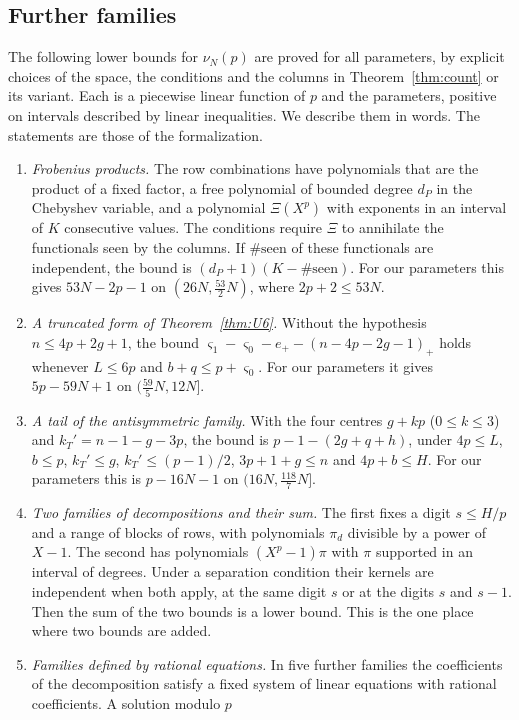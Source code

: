 \subsection{Further families}\label{ssec:families}
The following lower bounds for $\nu_N(p)$ are proved for all parameters, by explicit choices of the space,
the conditions and the columns in Theorem~\ref{thm:count} or its variant. Each is a piecewise linear function
of $p$ and the parameters, positive on intervals described by linear inequalities. We describe them in
words. The statements are those of the formalization.
\begin{enumerate}[label=(F\arabic*),wide]
\item \emph{Frobenius products.} The row combinations have polynomials that are the product of a fixed
factor, a free polynomial of bounded degree $d_P$ in the Chebyshev variable, and a polynomial $\Xi(X^p)$ with
exponents in an interval of $K$ consecutive values. The conditions require $\Xi$ to annihilate the
functionals seen by the columns. If $\#\text{seen}$ of these functionals are independent, the bound is
$(d_P+1)(K-\#\text{seen})$. For our parameters this gives $53N-2p-1$ on $(26N,\frac{53}2N)$, where $2p+2\le53N$.
\item \emph{A truncated form of Theorem~\ref{thm:U6}.} Without the hypothesis $n\le4p+2g+1$, the bound
$\varsigma_1-\varsigma_0-e_+-(n-4p-2g-1)_+$ holds whenever $L\le6p$ and $b+q\le p+\varsigma_0$. For our parameters it gives
$5p-59N+1$ on $(\frac{59}5N,12N]$.
\item \emph{A tail of the antisymmetric family.} With the four centres $g+kp$ ($0\le k\le3$) and
$k_T'=n-1-g-3p$, the bound is $p-1-(2g+q+h)$, under $4p\le L$, $b\le p$, $k_T'\le g$, $k_T'\le(p-1)/2$,
$3p+1+g\le n$ and $4p+b\le H$. For our parameters this is $p-16N-1$ on $(16N,\frac{118}7N]$.
\item \emph{Two families of decompositions and their sum.} The first fixes a digit $s\le H/p$ and a range of
blocks of rows, with polynomials $\pi_d$ divisible by a power of $X-1$. The second has polynomials
$(X^p-1)\pi$ with $\pi$ supported in an interval of degrees. Under a separation condition their kernels are
independent when both apply, at the same digit $s$ or at the digits $s$ and $s-1$. Then the sum of the two
bounds is a lower bound. This is the one place where two bounds are added.
\item \emph{Families defined by rational equations.} In five further families the coefficients of the
decomposition satisfy a fixed system of linear equations with rational coefficients. A solution modulo $p$

\end{enumerate}
